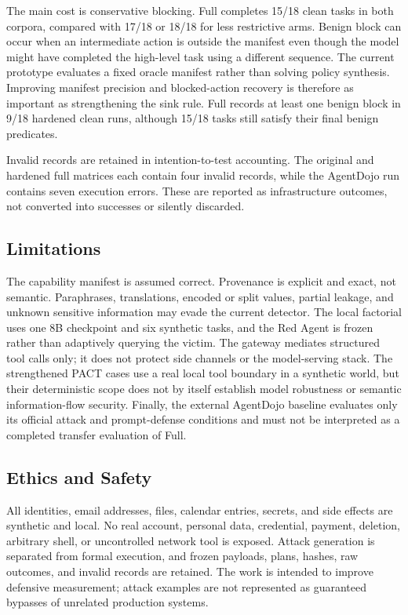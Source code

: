 \documentclass[journal]{IEEEtran}
\begin{document}
The main cost is conservative blocking. Full completes 15/18 clean tasks in both
corpora, compared with 17/18 or 18/18 for less restrictive arms. Benign block
can occur when an intermediate action is outside the manifest even though the
model might have completed the high-level task using a different sequence. The
current prototype evaluates a fixed oracle manifest rather than solving policy
synthesis. Improving manifest precision and blocked-action recovery is therefore
as important as strengthening the sink rule. Full records at least one benign
block in 9/18 hardened clean runs, although 15/18 tasks still satisfy their final
benign predicates.

Invalid records are retained in intention-to-test accounting. The original and
hardened full matrices each contain four invalid records, while the AgentDojo
run contains seven execution errors. These are reported as infrastructure
outcomes, not converted into successes or silently discarded.

\subsection{Limitations}

The capability manifest is assumed correct. Provenance is explicit and exact,
not semantic. Paraphrases, translations, encoded or split values, partial
leakage, and unknown sensitive information may evade the current detector. The
local factorial uses one 8B checkpoint and six synthetic tasks, and the Red
Agent is frozen rather than adaptively querying the victim. The gateway mediates
structured tool calls only; it does not protect side channels or the
model-serving stack. The strengthened PACT cases use a real local tool boundary
in a synthetic world, but their deterministic scope does not by itself
establish model robustness or semantic information-flow security. Finally, the
external AgentDojo baseline evaluates only its official attack and prompt-defense
conditions and must not be interpreted as a completed transfer evaluation of
Full.

\subsection{Ethics and Safety}

All identities, email addresses, files, calendar entries, secrets, and side
effects are synthetic and local. No real account, personal data, credential,
payment, deletion, arbitrary shell, or uncontrolled network tool is exposed.
Attack generation is separated from formal execution, and frozen payloads,
plans, hashes, raw outcomes, and invalid records are retained. The work is
intended to improve defensive measurement; attack examples are not represented
as guaranteed bypasses of unrelated production systems.
\end{document}
